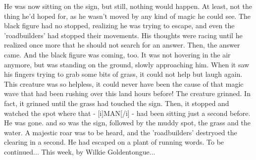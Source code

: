 He was now sitting on the sign, but still, nothing would happen. At least, not the thing he'd hoped for, as he wasn't moved by any kind of magic he could see. The black figure had no stopped, realizing he was trying to escape, and even the 'roadbuilders' had stopped their movements. His thoughts were racing until he realized once more that he should not search for an answer. Then, the answer came. 
And the black figure was coming, too. 
It was not hovering in the air anymore, but was standing on the ground, slowly approaching him. When it saw his fingers trying to grab some bits of grass, it could not help but laugh again. This creature was so helpless, it could never have been the cause of that magic wave that had been rushing over this land hours before! 
The creature grinned. 
In fact, it grinned until the grass had touched the sign. Then, it stopped and watched the spot where that - [i]MAN[/i] - had been sitting just a second before. 
He was gone. 
and so was the sign, followed by the muddy spot, the grass and the water. A majestic roar was to be heard, and the 'roadbuilders' destryoed the clearing in a second. He had escaped on a plant of running words. 
To be continued...
This week, by Wilkie Goldentongue...
